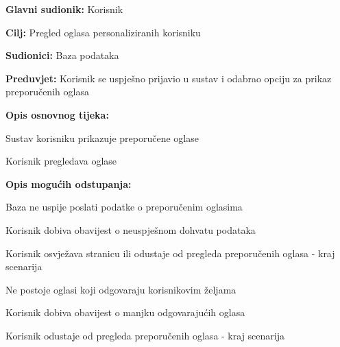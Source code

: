 					\noindent {}
					\begin{packed_item}
	
						\item \textbf{Glavni sudionik: }Korisnik
						\item  \textbf{Cilj:} Pregled oglasa personaliziranih korisniku
						\item  \textbf{Sudionici:} Baza podataka
						\item  \textbf{Preduvjet:} Korisnik se uspješno prijavio u sustav i odabrao opciju za prikaz preporučenih oglasa
						\item  \textbf{Opis osnovnog tijeka:}
						
						\item[] \begin{packed_enum}
							\item Sustav korisniku prikazuje preporučene oglase
							\item Korisnik pregledava oglase
						\end{packed_enum}

						\item  \textbf{Opis mogućih odstupanja:}

						\item[] \begin{packed_item}
							\item[1.a] Baza ne uspije poslati podatke o preporučenim oglasima
							\item[] \begin{packed_enum}
								
								\item Korisnik dobiva obavijest o neuspješnom dohvatu podataka
								\item Korisnik osvježava stranicu ili odustaje od pregleda preporučenih oglasa - kraj scenarija
							
							\end{packed_enum}	
							\item[1.b] Ne postoje oglasi koji odgovaraju korisnikovim željama
							\item[] \begin{packed_enum}
								
								\item Korisnik dobiva obavijest o manjku odgovarajućih oglasa
								\item Korisnik odustaje od pregleda preporučenih oglasa - kraj scenarija
							
							\end{packed_enum}	
						\end{packed_item}	
					\end{packed_item}


